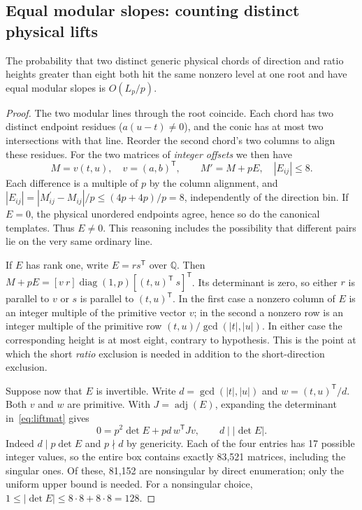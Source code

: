 \subsection{Equal modular slopes: counting distinct physical lifts}
\begin{lemma}\label{lem:lifts}
The probability that two distinct generic physical chords of direction and ratio heights greater than eight both hit the same nonzero level at one root and have equal modular slopes is $O(L_p/p)$.
\end{lemma}
\begin{proof}
The two modular lines through the root coincide. Each chord has two distinct endpoint residues ($a(u-t)\ne0$), and the conic has at most two intersections with that line. Reorder the second chord's two columns to align these residues. For the two matrices of \emph{integer offsets} we then have
\begin{equation}\label{eq:liftmat}
 M=v(t,u),\quad v=(a,b)^{\mathsf T},\qquad M'=M+pE,\quad |E_{ij}|\le8.
\end{equation}
Each difference is a multiple of $p$ by the column alignment, and $|E_{ij}|=|M^{\prime}_{ij}-M_{ij}|/p\le(4p+4p)/p=8$, independently of the direction bin. If $E=0$, the physical unordered endpoints agree, hence so do the canonical templates. Thus $E\ne0$. This reasoning includes the possibility that different pairs lie on the very same ordinary line.

If $E$ has rank one, write $E=rs^{\mathsf T}$ over $\mathbb Q$. Then $M+pE=[v\ r]\operatorname{diag}(1,p)[(t,u)^{\mathsf T}\ s]^{\mathsf T}$. Its determinant is zero, so either $r$ is parallel to $v$ or $s$ is parallel to $(t,u)^{\mathsf T}$. In the first case a nonzero column of $E$ is an integer multiple of the primitive vector $v$; in the second a nonzero row is an integer multiple of the primitive row $(t,u)/\gcd(|t|,|u|)$. In either case the corresponding height is at most eight, contrary to hypothesis. This is the point at which the short \emph{ratio} exclusion is needed in addition to the short-direction exclusion.

Suppose now that $E$ is invertible. Write $d=\gcd(|t|,|u|)$ and $w=(t,u)^{\mathsf T}/d$. Both $v$ and $w$ are primitive. With $J=\operatorname{adj}(E)$, expanding the determinant in~\eqref{eq:liftmat} gives
\begin{equation}\label{eq:bilin}
 0=p^2\det E+pd\,w^{\mathsf T}Jv,
 \qquad d\mid |\det E|.
\end{equation}
Indeed $d\mid p\det E$ and $p\nmid d$ by genericity. Each of the four entries has 17 possible integer values, so the entire box contains exactly 83,521 matrices, including the singular ones. Of these, 81,152 are nonsingular by direct enumeration; only the uniform upper bound is needed. For a nonsingular choice, $1\le |\det E|\le 8\cdot8+8\cdot8=128$.


\end{proof}
